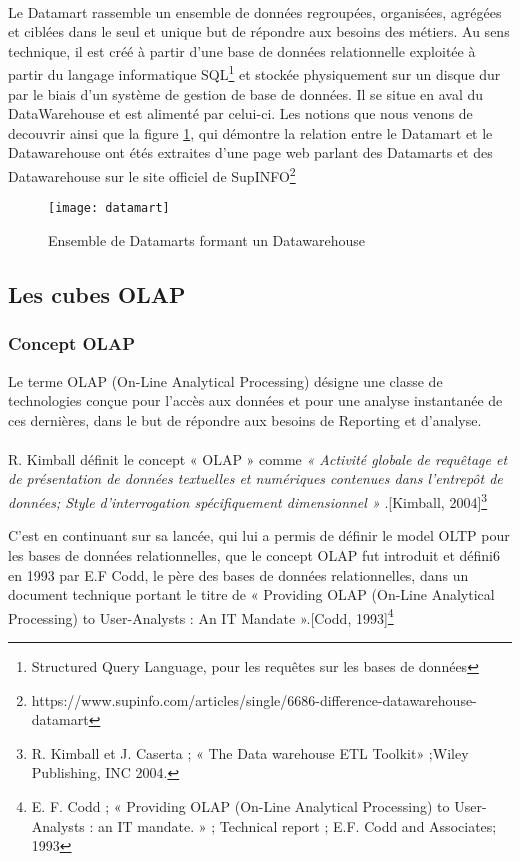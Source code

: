 \paragraph{}
Le Datamart rassemble un ensemble de données regroupées, organisées, agrégées et ciblées dans le seul et unique but de répondre aux besoins des métiers. Au sens technique, il est créé à partir d’une base de données relationnelle exploitée à partir du langage informatique SQL\footnote{Structured Query Language, pour les requêtes sur les bases de données} et stockée physiquement sur un disque dur par le biais d’un système de gestion de base de données. Il se situe en aval du DataWarehouse et est alimenté par celui-ci. Les notions que nous venons de decouvrir ainsi que la figure \ref{fig:datamart}, qui démontre la relation entre le Datamart et le Datawarehouse ont étés extraites d'une page web parlant des Datamarts et des Datawarehouse sur le site officiel de SupINFO\footnote{https://www.supinfo.com/articles/single/6686-difference-datawarehouse-datamart}
\begin{figure}[H]
    \centering
    \texttt{[image: datamart]}
    \caption{Ensemble de Datamarts formant un Datawarehouse}
    \label{fig:datamart}
\end{figure}


\subsection{Les cubes OLAP}

\subsubsection{Concept OLAP}
Le terme OLAP (On-Line Analytical Processing) désigne une classe de technologies conçue pour l’accès aux données et pour une analyse instantanée de ces dernières, dans le but de répondre aux besoins de Reporting et d’analyse.
\paragraph{}
R. Kimball définit le concept « OLAP » comme \textit{« Activité globale de requêtage et de
présentation de données textuelles et numériques contenues dans l’entrepôt de données; Style
d’interrogation spécifiquement dimensionnel » }.[Kimball, 2004]\footnote{R. Kimball et J. Caserta ; « The Data warehouse ETL Toolkit» ;Wiley
Publishing, INC 2004.}

C’est en continuant sur sa lancée, qui lui a permis de définir le model OLTP pour les bases de données relationnelles, que le concept OLAP fut introduit et défini6 en 1993 par E.F Codd, le père des bases de données relationnelles, dans un document technique portant le titre de « Providing OLAP (On-Line Analytical Processing) to User-Analysts : An IT Mandate ».[Codd, 1993]\footnote{E. F. Codd ; « Providing OLAP (On-Line Analytical Processing) to User-Analysts : an IT mandate. » ; Technical report ; E.F. Codd and Associates; 1993}

